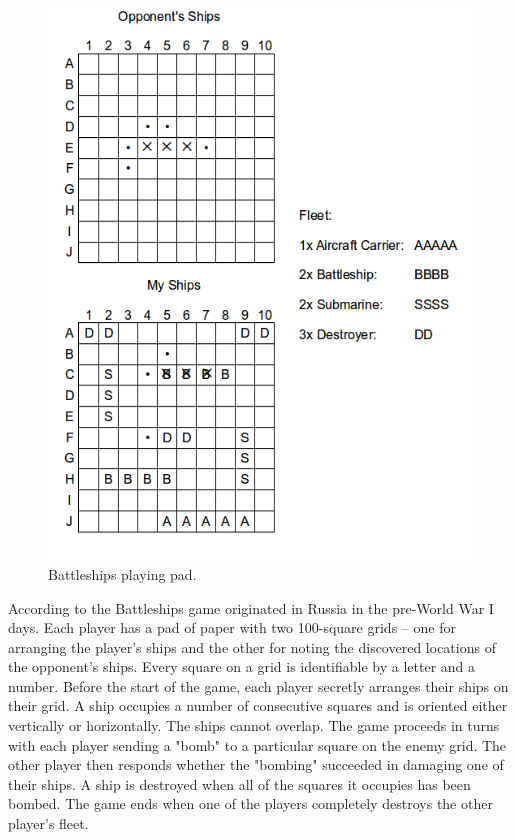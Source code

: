 \documentclass[10pt,a4paper]{article}
\begin{document}
\begin{figure}
  \centerline{\includegraphics[width=\textwidth]{fig2}}
  \caption{Battleships playing pad.}
  \label{fig:battleships_example}
\end{figure}

According to \cite{Battleships1931} the Battleships game originated in Russia in the pre-World War I days. Each player has a pad of paper with two 100-square grids -- one for arranging the player's ships and the other for noting the discovered locations of the opponent's ships. Every square on a grid is identifiable by a letter and a number. Before the start of the game, each player secretly arranges their ships on their grid. A ship occupies a number of consecutive squares and is oriented either vertically or horizontally. The ships cannot overlap. The game proceeds in turns with each player sending a "bomb" to a particular square on the enemy grid. The other player then responds whether the "bombing" succeeded in damaging one of their ships. A ship is destroyed when all of the squares it occupies has been bombed. The game ends when one of the players completely destroys the other player's fleet. 
\end{document}
